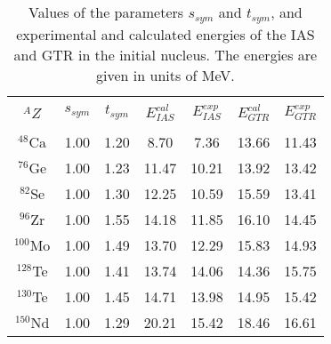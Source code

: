 \documentclass[nofootinbib,twocolumn,eqsecnum,floats,aps]{revtex4}
\begin{document}
{%
\begin{table}[th]
\centering
\caption {Values of the parameters $s_{sym}$ and $t_{sym}$, and  experimental
and calculated energies of the IAS and GTR  in the initial nucleus.
The energies are given in units of MeV.}
\label{T1}
\bigskip
\begin{tabular}{c|cccccc}%
\hline
\\$^AZ$  &$s_{sym}$&$t_{sym}$&$E_{IAS}^{cal}$& $E_{IAS}
^{exp}$&$E_{GTR}^{cal}$& $E_{GTR}^{exp}$\\
\\
\hline%
  {$^{48}$Ca}  &      1.00&      1.20      &      8.70&      7.36&     13.66&     11.43\\
   $^{76}$Ge   &      1.00&      1.23      &     11.47&     10.21&     13.92&     13.42\\
  {$^{82}$Se}  &      1.00&      1.30      &     12.25&     10.59&     15.59&     13.41\\
  {$^{96}$Zr}  &      1.00&      1.55      &     14.18&     11.85&     16.10&     14.45\\
 {$^{100}$Mo}  &      1.00&      1.49      &     13.70&     12.29&     15.83&     14.93\\
  {$^{128}$Te} &      1.00&      1.41      &     13.74&     14.06&     14.36&     15.75\\
  {$^{130}$Te} &      1.00&      1.45      &     14.71&     13.98&     14.95&     15.42\\
  {$^{150}$Nd} &      1.00&      1.29      &     20.21&     15.42&     18.46&     16.61\\


\end{tabular}
\end{table}}
\end{document}
